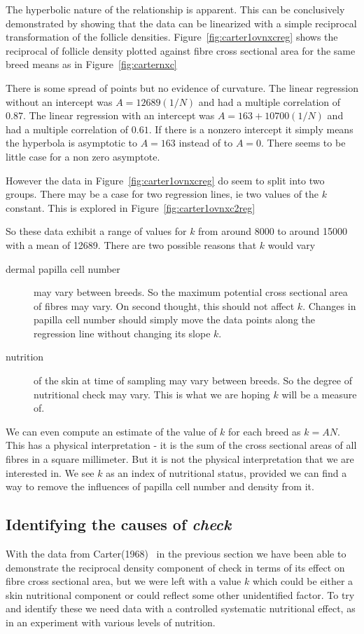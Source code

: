 \documentclass[titlepage]{article}  %
\begin{document}
The hyperbolic nature of the relationship is apparent. This can be conclusively demonstrated by showing that the data can be linearized with a simple reciprocal transformation of the follicle densities. Figure~\ref{fig:carter1ovnxcreg} shows the reciprocal of follicle density plotted against fibre cross sectional area for the same breed means as in Figure~\ref{fig:carternxc}

There is some spread of points but no evidence of curvature. The linear regression without an intercept was $A = 12689 (1/N)$ and had a multiple correlation of $0.87$.  The linear regression with an intercept was $A = 163 + 10700 (1/N)$ and had a multiple correlation of $0.61$. If there is a nonzero intercept it simply means the hyperbola is asymptotic to $A = 163$ instead of to $A = 0$. There seems to be little case for a non zero asymptote.

However the data in Figure~\ref{fig:carter1ovnxcreg} do seem to split into two groups. There may be a case for two regression lines, ie two values of the $k$ constant. This is explored in Figure~\ref{fig:carter1ovnxc2reg}

So these data exhibit a range of values for $k$ from around 8000 to around 15000 with a mean of 12689. There are two possible reasons that $k$ would vary
\begin{description}
\item[dermal papilla cell number] may vary between breeds. So the maximum potential cross sectional area of fibres may vary. On second thought, this should not affect $k$. Changes in papilla cell  number should simply move the data points along the regression line without changing its slope $k$.
\item[nutrition] of the skin at time of sampling may vary between breeds. So the degree of nutritional check may vary. This is what we are hoping $k$ will be a measure of.
\end{description}

We can even compute an estimate of the value of $k$ for each breed as $k = AN$.  This has a physical interpretation - it is the sum of the cross sectional areas of all fibres in a square millimeter. But it is not the physical interpretation that we are interested in. We see $k$ as an index of nutritional status, provided we can find a way to remove the influences of papilla cell number and density from it. 

\subsection{Identifying the causes of {\em check}}
With the data from Carter(1968)~\cite{cart:68} in the previous section we have been able to demonstrate the reciprocal density component of check in terms of its effect on fibre cross sectional area, but we were left with a value $k$ which could be either a skin nutritional component or could reflect some other unidentified factor.  To try and identify these we need data with a controlled systematic nutritional effect, as in an experiment with various levels of nutrition.
\end{document}
